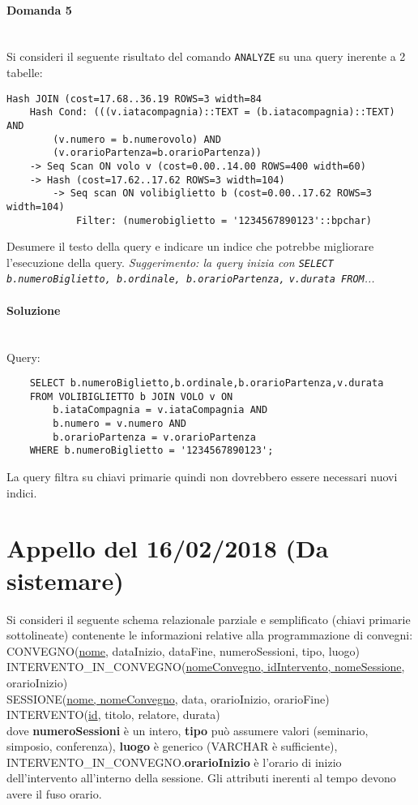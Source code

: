 \documentclass[a4paper, 10pt, titlepage]{article}
\begin{document}
\paragraph{Domanda 5}\dotfill
\\Si consideri il seguente risultato del comando \lstinline|ANALYZE| su una query inerente a 2 tabelle:
\begin{small}
\begin{lstlisting}
Hash JOIN (cost=17.68..36.19 ROWS=3 width=84
	Hash Cond: (((v.iatacompagnia)::TEXT = (b.iatacompagnia)::TEXT) AND 
		(v.numero = b.numerovolo) AND
		(v.orarioPartenza=b.orarioPartenza))
	-> Seq Scan ON volo v (cost=0.00..14.00 ROWS=400 width=60)
	-> Hash (cost=17.62..17.62 ROWS=3 width=104)
		-> Seq scan ON volibiglietto b (cost=0.00..17.62 ROWS=3 width=104)
			Filter: (numerobiglietto = '1234567890123'::bpchar)
\end{lstlisting}
\end{small}
Desumere il testo della query e indicare un indice che potrebbe migliorare l'esecuzione della query. \textit{Suggerimento: la query inizia con {\small \lstinline|SELECT b.numeroBiglietto, b.ordinale, b.orarioPartenza,| \lstinline|v.durata FROM|...}}
\paragraph{Soluzione}\dotfill
\\Query:
\begin{lstlisting}
	SELECT b.numeroBiglietto,b.ordinale,b.orarioPartenza,v.durata
	FROM VOLIBIGLIETTO b JOIN VOLO v ON 
		b.iataCompagnia = v.iataCompagnia AND
		b.numero = v.numero AND
		b.orarioPartenza = v.orarioPartenza
	WHERE b.numeroBiglietto = '1234567890123';
\end{lstlisting}
La query filtra su chiavi primarie quindi non dovrebbero essere necessari nuovi indici. 

\newpage

\section{Appello del 16/02/2018 (Da sistemare)}
Si consideri il seguente schema relazionale parziale e semplificato (chiavi primarie sottolineate) contenente le informazioni relative alla programmazione di convegni: \medskip \\
CONVEGNO(\underline{nome}, dataInizio, dataFine, numeroSessioni, tipo, luogo)\\
INTERVENTO\_IN\_CONVEGNO(\underline{nomeConvegno, idIntervento, nomeSessione}, orarioInizio)\\
SESSIONE(\underline{nome, nomeConvegno}, data, orarioInizio, orarioFine)\\
INTERVENTO(\underline{id}, titolo, relatore, durata)\medskip \\
dove \textbf{numeroSessioni} è un intero, \textbf{tipo} può assumere valori (seminario, simposio, conferenza), \textbf{luogo} è generico (VARCHAR è sufficiente), INTERVENTO\_IN\_CONVEGNO.\textbf{orarioInizio} è l'orario di inizio dell'intervento all'interno della sessione. Gli attributi inerenti al tempo devono avere il fuso orario.
\end{document}
